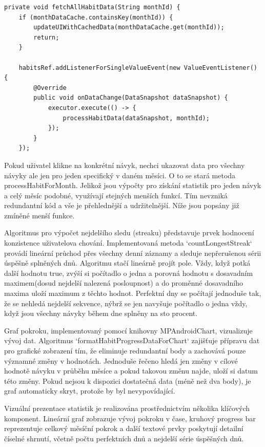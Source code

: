 \begin{lstlisting}[style=javastyle,caption = {Data Cache},label = {lst:isHabitVisibleOnDate}]
private void fetchAllHabitData(String monthId) {
    if (monthDataCache.containsKey(monthId)) {
        updateUIWithCachedData(monthDataCache.get(monthId));
        return;
    }

    habitsRef.addListenerForSingleValueEvent(new ValueEventListener() {
        @Override
        public void onDataChange(DataSnapshot dataSnapshot) {
            executor.execute(() -> {
                processHabitData(dataSnapshot, monthId);
            });
        }
    });
\end{lstlisting}

Pokud uživatel klikne na konkrétní návyk, nechci ukazovat data pro všechny návyky ale jen pro jeden specifický v daném měsíci. O to se stará metoda processHabitForMonth. Jelikož jsou výpočty pro získání statistik pro jeden návyk a celý měsíc podobné, využívají stejných menších funkcí. Tím nevzniká redundantní kód a vše je přehlednější a udržitelnější. Níže jsou popsány již zmíněné menší funkce.

Algoritmus pro výpočet nejdelšího sledu (streaku) představuje prvek hodnocení konzistence uživatelova chování. Implementovaná metoda `countLongestStreak` provádí lineární průchod přes všechny denní záznamy a sleduje nepřerušenou sérii úspěšně splněných dnů. Algoritmu stačí lineárně projít pole. Vždy, když potká další hodnotu true, zvýší si počítadlo o jedna a porovná hodnotu s dosavadním maximem(dosud nejdelší nalezená posloupnost) a do proměnné dosavadního maxima uloží maximum z těchto hodnot. Perfektní dny se počítají jednoduše tak, že se nehledá nejdelší sekvence, nýbrž se jen navyšuje počítadlo o jedna vždy, když jsou všechny návyky během dne splněny na sto procent.

Graf pokroku, implementovaný pomocí knihovny MPAndroidChart, vizualizuje vývoj dat. Algoritmus `formatHabitProgressDataForChart` zajišťuje přípravu dat pro grafické zobrazení tím, že eliminuje redundantní body a zachovává pouze významné změny v hodnotách. Jednoduše řečeno hledá jen změny v cílové hodnotě návyku v průběhu měsíce a pokud takovou změnu najde, uloží si datum této změny. Pokud nejsou k dispozici dostatečná data (méně než dva body), je graf automaticky skryt, protože by byl nevypovídající.

Vizuální prezentace statistik je realizována prostřednictvím několika klíčových komponent. Lineární graf zobrazuje vývoj pokroku v čase, kruhový progress bar reprezentuje celkový měsíční pokrok a další textové prvky poskytují detailní číselné shrnutí, včetně počtu perfektních dnů a nejdelší série úspěšných dnů.
\newpage
